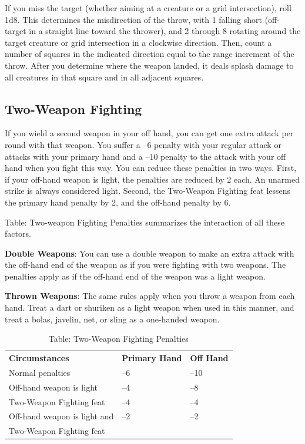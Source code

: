 If you miss the target (whether aiming at a creature or a grid intersection), roll 1d8. This determines the misdirection of the throw, with 1 falling short (off-target in a straight line toward the thrower), and 2 through 8 rotating around the target creature or grid intersection in a clockwise direction. Then, count a number of squares in the indicated direction equal to the range increment of the throw. After you determine where the weapon landed, it deals splash damage to all creatures in that square and in all adjacent squares.
				
\subsection{Two-Weapon Fighting}

				
If you wield a second weapon in your off hand, you can get one extra attack per round with that weapon. You suffer a --6 penalty with your regular attack or attacks with your primary hand and a --10 penalty to the attack with your off hand when you fight this way. You can reduce these penalties in two ways. First, if your off-hand weapon is light, the penalties are reduced by 2 each. An unarmed strike is always considered light. Second, the Two-Weapon Fighting feat lessens the primary hand penalty by 2, and the off-hand penalty by 6.
				
Table: Two-weapon Fighting Penalties summarizes the interaction of all these factors.
				
\textbf{Double Weapons}: You can use a double weapon to make an extra attack with the off-hand end of the weapon as if you were fighting with two weapons. The penalties apply as if the off-hand end of the weapon was a light weapon.
				
\textbf{Thrown Weapons}: The same rules apply when you throw a weapon from each hand. Treat a dart or shuriken as a light weapon when used in this manner, and treat a bolas, javelin, net, or sling as a one-handed weapon.

\begin{table}[]
\sffamily
\caption{Table: Two-Weapon Fighting Penalties}
\begin{tabular}{lll}
\textbf{Circumstances} & \textbf{Primary Hand} & \textbf{Off Hand}\\
Normal penalties & --6 & --10\\
Off-hand weapon is light & --4 & --8\\
Two-Weapon Fighting feat & --4 & --4\\
Off-hand weapon is light and  & --2 & --2\\
Two-Weapon Fighting feat & \\
\end{tabular}
\end{table}

